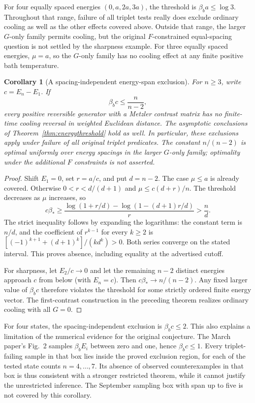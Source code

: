 \documentclass[11pt]{article}
\newtheorem{corollary}{Corollary}
\begin{document}
For four equally spaced energies $(0,a,2a,3a)$, the threshold is
$\beta_ba\leq\log3$. Throughout that range, failure of all triplet tests
really does exclude ordinary cooling as well as the other effects covered
above. Outside that range, the larger $G$-only family permits cooling, but
the original $F$-constrained equal-spacing question is not settled by the
sharpness example. For three equally spaced energies, $\mu=a$, so the
$G$-only family has no cooling effect at any finite positive bath temperature.

\begin{corollary}[A spacing-independent energy-span exclusion]\label{cor:span}
For $n\geq3$, write $c=E_n-E_1$. If
\[
\beta_b c\leq \frac{n}{n-2},
\]
every positive reversible generator with a Metzler contrast matrix has no
finite-time cooling reversal in weighted Euclidean distance. The asymptotic
conclusions of Theorem~\ref{thm:energythreshold} hold as well. In particular,
these exclusions apply under failure of all original triplet predicates.
The constant $n/(n-2)$ is optimal uniformly over energy spacings in the
larger $G$-only family; optimality under the additional $F$ constraints is
not asserted.
\end{corollary}
\begin{proof}
Shift $E_1=0$, set $r=a/c$, and put $d=n-2$. The case $\mu\leq a$ is
already covered. Otherwise $0<r<d/(d+1)$ and
$\mu\leq c(d+r)/n$. The threshold decreases as $\mu$ increases, so
\[
c\beta_*\geq
\frac{\log(1+r/d)-\log(1-(d+1)r/d)}{r}
>\frac nd.
\]
The strict inequality follows by expanding the logarithms: the constant
term is $n/d$, and the coefficient of $r^{k-1}$ for every $k\geq2$ is
$[(-1)^{k+1}+(d+1)^k]/(k d^k)>0$. Both series converge on the stated
interval. This proves absence, including equality at the advertised cutoff.

For sharpness, let $E_2/c\to0$ and let the remaining $n-2$ distinct energies
approach $c$ from below (with $E_n=c$). Then $c\beta_*\to n/(n-2)$.
Any fixed larger value of $\beta_b c$ therefore violates the threshold for
some strictly ordered finite energy vector. The first-contrast construction
in the preceding theorem realizes ordinary cooling with all $G=0$.
\end{proof}

For four states, the spacing-independent exclusion is $\beta_b c\leq2$.
This also explains a limitation of the numerical evidence for the original
conjecture. The March paper's Fig.~2 samples $\beta_bE_i$ between zero and
one, hence $\beta_b c\leq1$. Every triplet-failing sample in that box lies
inside the proved exclusion region, for each of the tested state counts
$n=4,\ldots,7$. Its absence of observed counterexamples in that box is thus
consistent with a stronger restricted theorem, while it cannot justify the
unrestricted inference. The September sampling box with span up to five is
not covered by this corollary.
\end{document}
